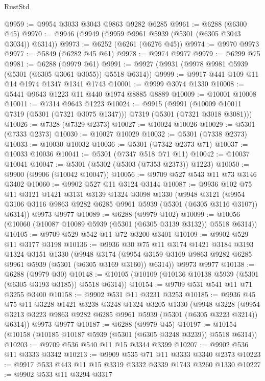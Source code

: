 \begin{lexlean}{RustStd}
\begin{coremodule}
@9959 := @9954 @3033 @3043 @9863 @9282 @6285
@9961 := @6288 (@6300 @45)
@9970 := @9946 (@9949 (@9959 @9961 @5939 (@5301 (@6305 @3043 @3034)) @6314))
@9973 := @6252 (@6261 (@6276 @45))
@9974 := @9970 @9973
@9977 := @5849 (@6282 @45 @61)
@9978 := @9974 @9977
@9979 := @6299 @75
@9981 := @6288 (@9979 @61)
@9991 := @9927 (@9931 (@9978 @9981 @5939 (@5301 (@6305 @3061 @3055)) @5518 @6314))
@9999 := @9917 @441 @109 @11 @14 @1974 @1347 @1341 @1743
@10001 := @9999 @3074 @1330
@10008 := @5441 @9643 @1223 @11 @440 @1974 @8885 @8889
@10009 := @10001 @10008
@10011 := @7314 @9643 @1223
@10024 := @9915
    (@9991 (@10009 @10011 @7319 (@5301 (@7321 @3075 @1347))) @7319 (@5301 (@7321 @3018 @3081)))
@10026 := @7328 (@7329 @2373)
@10027 := @10024 @10026
@10029 := @5301 (@7333 @2373)
@10030 := @10027 @10029
@10032 := @5301 (@7338 @2373)
@10033 := @10030 @10032
@10036 := @5301 (@7342 @2373 @71)
@10037 := @10033 @10036
@10041 := @5301 (@7347 @518 @71 @11)
@10042 := @10037 @10041
@10047 := @5301 (@5302 (@5303 (@7353 @2373)) @1223)
@10050 := @9900 (@9906 (@10042 @10047))
@10056 := @9709 @527 @543 @11 @73 @3146 @3402
@10060 := @9902 @527 @11 @3124 @3144
@10087 := @9936
    @102
    @75
    @11
    @3121
    @1421
    @3131
    @3139
    @1324
    @3098
    @1330
    (@9948
      @3121
      (@9954 @3106 @3116 @9863 @9282 @6285 @9961 @5939 (@5301 (@6305 @3116 @3107)) @6314))
    @9973
    @9977
@10089 := @6288 (@9979 @102)
@10099 := @10056 (@10060 (@10087 @10089 @5939 (@5301 (@6305 @3139 @3132)) @5518 @6314))
@10105 := @9709 @529 @542 @11 @72 @3200 @3401
@10109 := @9902 @529 @11 @3177 @3198
@10136 := @9936
    @30
    @75
    @11
    @3174
    @1421
    @3184
    @3193
    @1324
    @3151
    @1330
    (@9948
      @3174
      (@9954 @3159 @3169 @9863 @9282 @6285 @9961 @5939 (@5301 (@6305 @3169 @3160)) @6314))
    @9973
    @9977
@10138 := @6288 (@9979 @30)
@10148 := @10105 (@10109 (@10136 @10138 @5939 (@5301 (@6305 @3193 @3185)) @5518 @6314))
@10154 := @9709 @531 @541 @11 @71 @3255 @3400
@10158 := @9902 @531 @11 @3231 @3253
@10185 := @9936
    @45
    @75
    @11
    @3228
    @1421
    @3238
    @3248
    @1324
    @3205
    @1330
    (@9948
      @3228
      (@9954 @3213 @3223 @9863 @9282 @6285 @9961 @5939 (@5301 (@6305 @3223 @3214)) @6314))
    @9973
    @9977
@10187 := @6288 (@9979 @45)
@10197 := @10154 (@10158 (@10185 @10187 @5939 (@5301 (@6305 @3248 @3239)) @5518 @6314))
@10203 := @9709 @536 @540 @11 @15 @3344 @3399
@10207 := @9902 @536 @11 @3333 @3342
@10213 := @9909 @535 @71 @11 @3333 @3340 @2373
@10223 := @9917 @533 @443 @11 @15 @3319 @3332 @3339 @1743 @3260 @1330
@10227 := @9902 @533 @11 @3294 @3317

\end{coremodule}
\end{lexlean}
